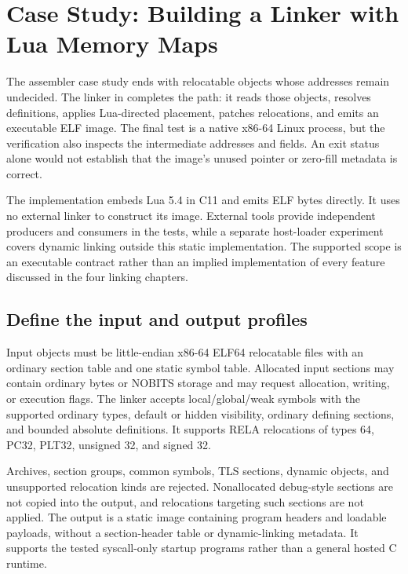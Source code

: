 \chapter{Case Study: Building a Linker with Lua Memory Maps}
\label{ch:lua-linker}

The assembler case study ends with relocatable objects whose addresses remain undecided.
The linker in  completes the path: it reads those objects, resolves definitions, applies Lua-directed placement, patches relocations, and emits an executable ELF image.
The final test is a native x86-64 Linux process, but the verification also inspects the intermediate addresses and fields.
An exit status alone would not establish that the image's unused pointer or zero-fill metadata is correct.

The implementation embeds Lua 5.4 in C11 and emits ELF bytes directly.
It uses no external linker to construct its image.
External tools provide independent producers and consumers in the tests, while a separate host-loader experiment covers dynamic linking outside this static implementation.
The supported scope is an executable contract rather than an implied implementation of every feature discussed in the four linking chapters.

\section{Define the input and output profiles}
\label{sec:ch60-profile}

Input objects must be little-endian x86-64 ELF64 relocatable files with an ordinary section table and one static symbol table.
Allocated input sections may contain ordinary bytes or NOBITS storage and may request allocation, writing, or execution flags.
The linker accepts local/global/weak symbols with the supported ordinary types, default or hidden visibility, ordinary defining sections, and bounded absolute definitions.
It supports RELA relocations of types 64, PC32, PLT32, unsigned 32, and signed 32.

Archives, section groups, common symbols, TLS sections, dynamic objects, and unsupported relocation kinds are rejected.
Nonallocated debug-style sections are not copied into the output, and relocations targeting such sections are not applied.
The output is a static  image containing program headers and loadable payloads, without a section-header table or dynamic-linking metadata.
It supports the tested syscall-only startup programs rather than a general hosted C runtime.

